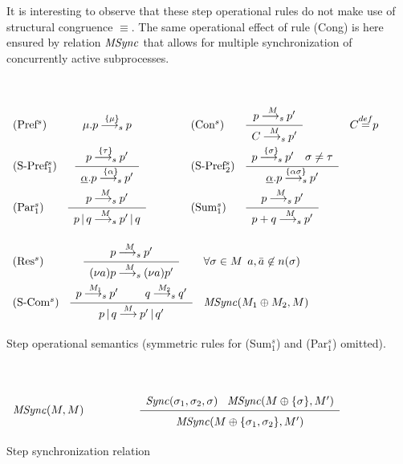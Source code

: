 It is interesting to observe that these step operational rules do not make use of structural congruence $\equiv$. The same
operational effect of rule (Cong) is here ensured by relation $\mathit{MSync}$ that allows for multiple synchronization 
of concurrently active subprocesses. 


\begin{table}[t]
\hrulefill\\[-.4cm]

{\renewcommand{\arraystretch}{2.5}
\begin{center}
$\begin{array}{lcllllcl}
\mbox{(Pref$^s$)}  & \mu.p\derivas{\{\mu\}}p & \qquad &
\mbox{(Con$^s$)} & \bigfrac{p\derivas{M}p'}{C \derivas{M}p'}& C \eqdef p &  \\
\mbox{(S-Pref$_1^s$)}  & \bigfrac{p\derivas{\{\tau\}}p'}{\underline{\alpha}.p\derivas{\{\alpha\}}p'} & \qquad &
\mbox{(S-Pref$_2^s$)}  & \bigfrac{p\derivas{\{\sigma\}}p' \quad \sigma \neq \tau}{\underline{\alpha}.p\derivas{\{\alpha\sigma\}}p'} \\

\mbox{(Par$_1^s$)}  & \bigfrac{p\derivas{M}p'}{p\para q\derivas{M}p'\para q} & \qquad &
\mbox{(Sum$_1^s$)}  & \bigfrac{p\derivas{M}p'}{p+q\derivas{M}p'} \\
\end{array}$

$\begin{array}{lcllcl}

\mbox{(Res$^s$)}  & \bigfrac{p\derivas{M}p'}{\restr{a}p\derivas{M}
\restr{a}p'} & \forall \sigma \in M\, \; a, \bar{a} \not\in n(\sigma)\;  &\\

\mbox{(S-Com$^s$)}  & \bigfrac{p\derivas{M_1} p'\spazio q\derivas{M_2}q'}{p
\para q \deriv{M}p'\para q'} & \MSync(M_1 \oplus M_2, M) &\\
\end{array}$

\hrulefill
\end{center}}
\caption{Step operational semantics (symmetric rules for (Sum$_1^s$) and (Par$_1^s$) omitted).}\label{step-rules}
\end{table}


\begin{table}[t]
\hrulefill\\[-.4cm]
\begin{center}

$\begin{array}{lcr}
\MSync(M, M) & \qquad \quad & \bigfrac{\Sync(\sigma_1, \sigma_2, \sigma) \; \;  \; \MSync(M\oplus\{\sigma\}, M')}
{\MSync(M \oplus \{\sigma_1, \sigma_2\}, M' )}  
\end{array}$

\end{center}
\hrulefill
\caption{Step synchronization relation}\label{Msync}
\end{table}

